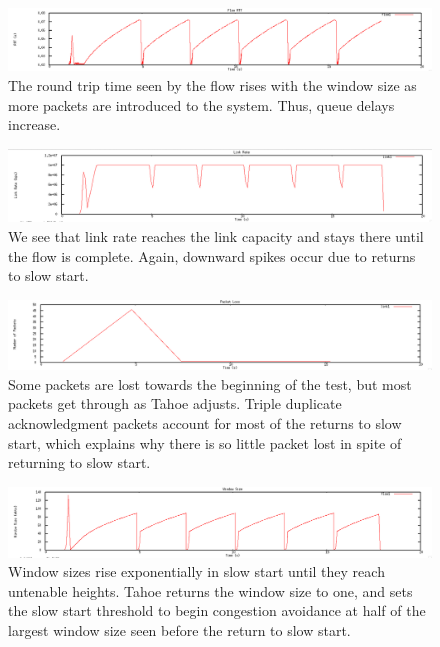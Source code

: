 \documentclass[12pt]{article}
\begin{document}
\begin{figure}[!ht]
\centering \includegraphics[bb= 0 0 1300 250, scale=.35]{figures/Test0_Tahoe/flow_rtt.png}
\caption{The round trip time seen by the flow rises with the window size as more packets are introduced to the system.  Thus, queue delays increase.}
\label{fig:test0_tahoe_flow_rtt}
\end{figure}

\begin{figure}[!ht]
\centering \includegraphics[bb= 0 0 1300 250, scale=.35]{figures/Test0_Tahoe/link_rate.png}
\caption{We see that link rate reaches the link capacity and stays there until the flow is complete. Again, downward spikes occur due to returns to slow start.}
\label{fig:test0_tahoe_link_rate}
\end{figure}

\begin{figure}[!ht]
\centering \includegraphics[bb= 0 0 1300 250, scale=.35]{figures/Test0_Tahoe/packet_loss.png}
\caption{Some packets are lost towards the beginning of the test, but most packets get through as Tahoe adjusts. Triple duplicate acknowledgment packets account for most of the returns to slow start, which explains why there is so little packet lost in spite of returning to slow start.}
\label{fig:test0_tahoe_packet_loss}
\end{figure}

\begin{figure}[!ht]
\centering \includegraphics[bb= 0 0 1300 250, scale=.35]{figures/Test0_Tahoe/window_size.png}
\caption{Window sizes rise exponentially in slow start until they reach untenable heights. Tahoe returns the window size to one, and sets the slow start threshold to begin congestion avoidance at half of the largest window size seen before the return to slow start.}
\label{fig:test0_tahoe_windnow_size}
\end{figure}
\end{document}

